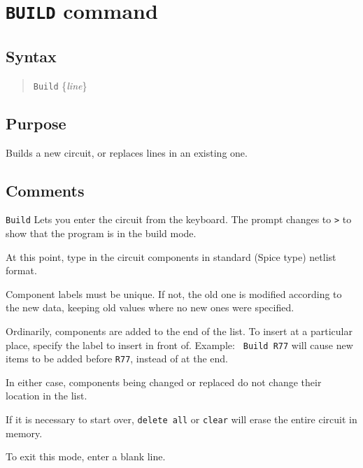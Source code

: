\section{{\tt BUILD} command}
\subsection{Syntax}
\begin{verse}
{\tt Build} \{{\it line}\}
\end{verse}
\subsection{Purpose}

Builds a new circuit, or replaces lines in an existing one.
\subsection{Comments}

{\tt Build} Lets you enter the circuit from the keyboard.  The prompt changes 
to {\tt >} to show that the program is in the build mode.

At this point, type in the circuit components in standard (Spice type)
netlist format.

Component labels must be unique.  If not, the old one is modified according
to the new data, keeping old values where no new ones were specified.

Ordinarily, components are added to the end of the list.  To insert at a
particular place, specify the label to insert in front of.  Example: {\tt
Build R77} will cause new items to be added before {\tt R77}, instead of at
the end.

In either case, components being changed or replaced do not change their
location in the list.

If it is necessary to start over, {\tt delete all} or {\tt clear} will erase
the entire circuit in memory.

To exit this mode, enter a blank line.
